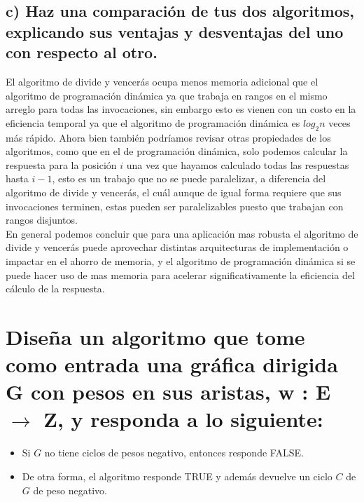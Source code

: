 \documentclass[12pt]{article}
\begin{document}
\subsection{c) Haz una comparación de tus dos algoritmos, explicando sus ventajas y desventajas del uno con respecto al otro.}
El algoritmo de divide y vencerás ocupa menos memoria adicional que el algoritmo de programación dinámica ya que trabaja en rangos en el mismo arreglo para todas las invocaciones, sin embargo esto es vienen con un costo en la eficiencia temporal ya que el algoritmo de programación dinámica es $log_2n$ veces más rápido. Ahora bien también podríamos revisar otras propiedades de los algoritmos, como que en el de programación dinámica, solo podemos calcular la respuesta para la posición $i$ una vez que hayamos calculado todas las respuestas hasta $i-1$, esto es un trabajo que no se puede paralelizar, a diferencia del algoritmo de divide y vencerás, el cuál aunque de igual forma requiere que sus invocaciones terminen, estas pueden ser paralelizables puesto que trabajan con rangos disjuntos.\\
En general podemos concluir que para una aplicación mas robusta el algoritmo de divide y vencerás puede aprovechar distintas arquitecturas de implementación o impactar en el ahorro de memoria, y el algoritmo de programación dinámica si se puede hacer uso de mas memoria para acelerar significativamente la eficiencia del cálculo de la respuesta.
\section{Diseña un algoritmo que tome como entrada una gráfica dirigida G con pesos en sus aristas, w : E  $\rightarrow$ Z, y responda a lo siguiente:}
\begin{itemize}
	\item Si $G$ no tiene ciclos de pesos negativo, entonces responde FALSE.
	\item De otra forma, el algoritmo responde TRUE y además devuelve un ciclo $C$ de $G$ de peso negativo.
\end{itemize}
\end{document}
